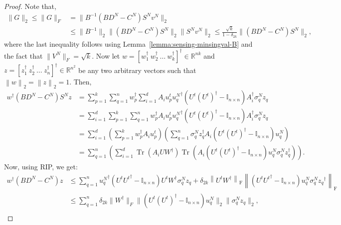 \documentclass[11pt]{article}
\renewcommand{\eqref}[1]{\hyperref[#1]{(\ref*{#1})}}
\theoremstyle{plain}
\theoremstyle{definition}
\newcommand{\Tr}{\operatorname{Tr}}
\newcommand{\frob}[1]{\left\| {#1} \right\|_\text{F}}
\newcommand{\twonorm}[1]{\left\| {#1} \right\|_2}
\newcommand{\Ut}{U^{t}}
\newcommand{\Vn}{V^N}
\newcommand{\sn}{\sigma^N}
\newcommand{\un}{u^N}
\newcommand{\ut}{u^t}
\begin{document}
\begin{proof}
Note that, 
\begin{align}
  \|G\|_2\leq \|G\|_F&=\|B^{-1}(BD^N-C^N)S^Nv^N\|_2\nonumber\\&\leq \|B^{-1}\|_2\|(BD^N-C^N)S^N\|_2\|S^Nv^N\|_2\leq \frac{\sqrt{k}}{1-\delta_{2k}} \|(BD^N-C^N)S^N\|_2,
\end{align}
where the last inequality follows using Lemma~\ref{lemma:sensing-minsingval-B} and the fact that $\|\Vn\|_F=\sqrt{k}$. 
Now let $w=[w_1^\dag\ w_2^\dag\ \dots\ w_k^\dag]^\dag\in \mathbb{R}^{nk}$ and $z=[z_1^\dag\ z_2^\dag\ \dots\ z_n^\dag]^\dag\in \mathbb{R}^{n^2}$ be any two arbitrary vectors such that $\twonorm{w}=\twonorm{z}=1$. Then, 
\begin{align*}
  w^\dag \left(BD^N-C^N\right)S^Nz &= \sum_{p=1}^k \sum_{q=1}^n
    w_p^\dag  \sum_{i=1}^d A_i\ut_p {\un_q}^\dag  \left(\Ut(\Ut)^\dag -\mathbb{I}_{n\times n}\right) A_i^\dag  \sn_qz_q \\
  &= \sum_{i=1}^d \sum_{p=1}^k \sum_{q=1}^n w_p^\dag  A_i\ut_p {\un_q}^\dag  \left(\Ut(\Ut)^\dag -\mathbb{I}_{n\times n}\right) A_i^\dag  \sn_qz_q \\
  &= \sum_{i=1}^d \left(\sum_{p=1}^k w_p^\dag  A_i\ut_p \right) \left(\sum_{q=1}^n \sn_qz_q^\dag  A_i \left(\Ut(\Ut)^\dag -\mathbb{I}_{n\times n}\right)\un_q \right) \\
  &= \sum_{q=1}^n \left(\sum_{i=1}^d \Tr\left(A_iUW^\dag \right) \Tr\left(A_i\left(\Ut(\Ut)^\dag -\mathbb{I}_{n\times n}\right) \un_q \sn_qz_q^\dag \right)\right).
\end{align*}
Now, using RIP, we get:
\begin{align*}
  w^\dag \left(BD^N-C^N\right)z&\leq \sum_{q=1}^n {\un_q}^\dag \left(\Ut{\Ut}^\dag -\mathbb{I}_{n\times n}\right)\Ut W^\dag \sn_qz_q
	+ \delta_{2k} \frob{\Ut W^\dag } \frob{\left(\Ut{\Ut}^\dag -\mathbb{I}_{n\times n}\right)\un_q\sn_q{z_q}^\dag } \\
  &\leq \sum_{q=1}^n \delta_{2k} \|W^\dag\|_F \|(\Ut(\Ut)^\dag -\mathbb{I}_{n\times n})\un_q\|_2\|\sn_q{z_q}\|_2,\\%

\end{align*}
\end{proof}
\end{document}
